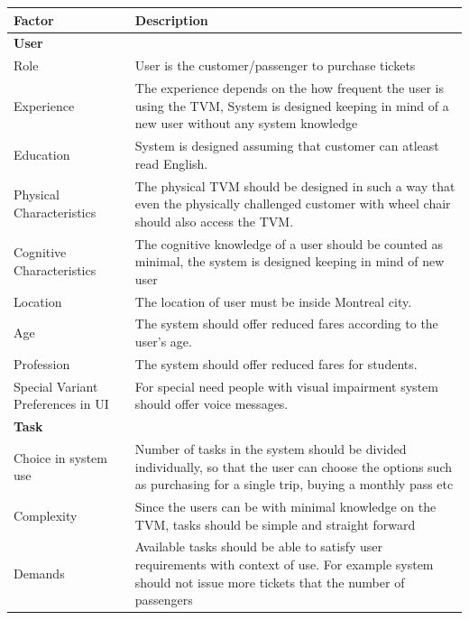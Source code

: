 \documentclass[a4paper,12pt]{report}
\begin{document}
\setlength{\tabcolsep}{18pt}
\renewcommand{\arraystretch}{1.5}
\begin{tabular}[H]{ |p{3cm}|p{12cm}| }
	\hline
	\textbf{Factor}  & \textbf{Description}  \\
	\hline
	\textbf{User} &   \\
	\hline
	Role &
	User is the customer/passenger to purchase tickets
	\\
	\hline
	Experience & 
	The experience depends on the how frequent the user is using the TVM, System is designed keeping in mind of a new user without any system knowledge
	\\
	\hline
	Education &
	System is designed assuming that customer can atleast read English.
	\\
	\hline
	Physical Characteristics    &
	The physical TVM should be designed in such a way that even the physically challenged customer with wheel chair should also access the TVM.
	\\
	\hline
	Cognitive Characteristics & 
	The cognitive knowledge of a user should be counted as minimal, the system is designed keeping in mind of new user
	\\
	\hline
	Location & 
	The location of user must be inside Montreal city.
	\\
	\hline
	Age & 
	The system should offer reduced fares according to the user's age.
	\\
	\hline
	Profession & 
	The system should offer reduced fares for students.
	\\
	\hline
	Special Variant Preferences in UI & 
	For special need people with visual impairment system should offer voice messages.



	\\
	\hline
	\textbf{Task} &  \\
	\hline
	Choice in system use &
	Number of tasks in the system should be divided individually, so that the user can choose the options such as purchasing for a single trip, buying a monthly pass etc
	\\
	\hline
	Complexity & 
	Since the users can be with minimal knowledge on the TVM, tasks should be simple and straight forward
	\\
	\hline
	Demands &
	Available tasks should be able to satisfy user requirements with context of use. For example system should not issue more tickets that the number of passengers 
	\\
	\hline 
\end{tabular}
\\ 
\end{document}
